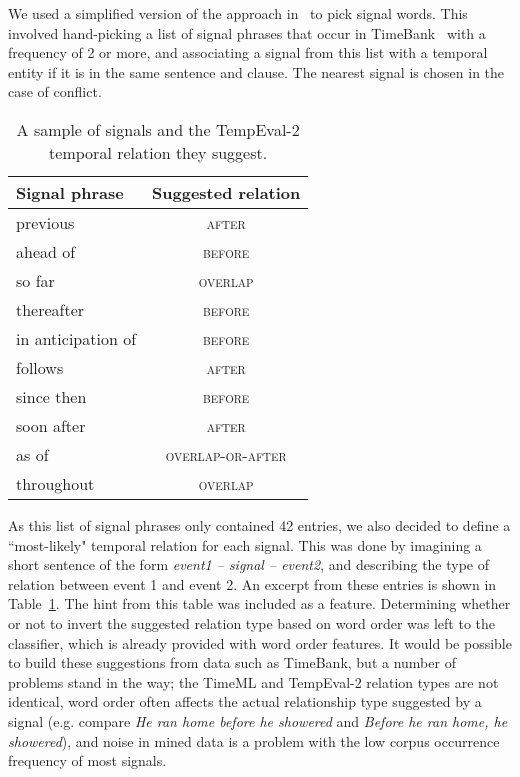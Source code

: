 \documentclass[11pt]{article}
\begin{document}
We used a simplified version of the approach in~ to pick signal words. This involved hand-picking a list of signal phrases that occur in TimeBank~\cite{pustejovsky2003timebank} with a frequency of 2 or more, and associating a signal from this list with a temporal entity if it is in the same sentence and clause. The nearest signal is chosen in the case of conflict.

\small
\begin{table}
\begin{center}
\caption{A sample of signals and the TempEval-2 temporal relation they suggest.}
\label{tab:signalHints}
\begin{tabular}{| l | c |}
\hline
 \textbf{Signal phrase} & \textbf{Suggested relation} \\
\hline
previous & \textsc{after} \\
ahead of & \textsc{before} \\
so far & \textsc{overlap} \\
thereafter & \textsc{before} \\
in anticipation of & \textsc{before} \\
follows & \textsc{after} \\
since then & \textsc{before} \\
soon after & \textsc{after} \\
as of & \textsc{overlap-or-after} \\
throughout & \textsc{overlap} \\
\hline
\end{tabular}
\end{center}
\end{table}
\normalsize

As this list of signal phrases only contained 42 entries, we also decided to define a ``most-likely" temporal relation for each signal. This was done by imagining a short sentence of the form \emph{event1 -- signal -- event2}, and describing the type of relation between event 1 and event 2. An excerpt from these entries is shown in Table~\ref{tab:signalHints}. The hint from this table was included as a feature. Determining whether or not to invert the suggested relation type based on word order was left to the classifier, which is already provided with word order features. It would be possible to build these suggestions from data such as TimeBank, but a number of problems stand in the way; the TimeML and TempEval-2 relation types are not identical, word order often affects the actual relationship type suggested by a signal (e.g. compare \emph{He ran home before he showered} and \emph{Before he ran home, he showered}), and noise in mined data is a problem with the low corpus occurrence frequency of most signals.
\end{document}
